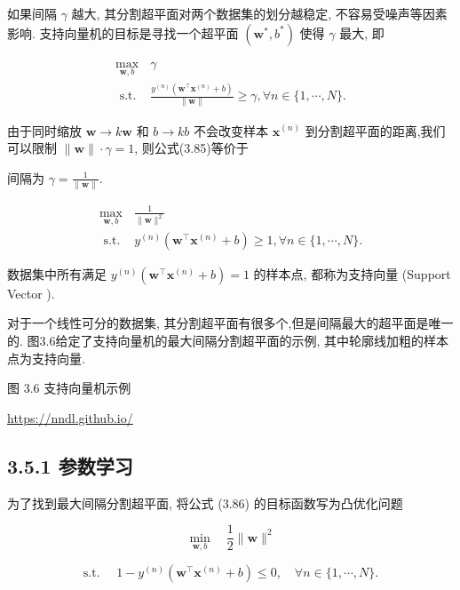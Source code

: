 \documentclass[10pt]{article}
\begin{document}
如果间隔 $\gamma$ 越大, 其分割超平面对两个数据集的划分越稳定, 不容易受噪声等因素影响. 支持向量机的目标是寻找一个超平面 $\left(\boldsymbol{w}^{*}, b^{*}\right)$ 使得 $\gamma$ 最大, 即


\begin{align*}
\max _{\boldsymbol{w}, b} & \gamma  \tag{3.85}\\
\text { s.t. } & \frac{y^{(n)}\left(\boldsymbol{w}^{\top} \boldsymbol{x}^{(n)}+b\right)}{\|\boldsymbol{w}\|} \geq \gamma, \forall n \in\{1, \cdots, N\} .
\end{align*}


由于同时缩放 $\boldsymbol{w} \rightarrow k \boldsymbol{w}$ 和 $b \rightarrow k b$ 不会改变样本 $\boldsymbol{x}^{(n)}$ 到分割超平面的距离,我们可以限制 $\|\boldsymbol{w}\| \cdot \gamma=1$, 则公式(3.85)等价于

间隔为 $\gamma=\frac{1}{\|\boldsymbol{w}\|}$.


\begin{align*}
\max _{\boldsymbol{w}, b} & \frac{1}{\|\boldsymbol{w}\|^{2}}  \tag{3.86}\\
\text { s.t. } & y^{(n)}\left(\boldsymbol{w}^{\top} \boldsymbol{x}^{(n)}+b\right) \geq 1, \forall n \in\{1, \cdots, N\} .
\end{align*}


数据集中所有满足 $y^{(n)}\left(\boldsymbol{w}^{\top} \boldsymbol{x}^{(n)}+b\right)=1$ 的样本点, 都称为支持向量 (Support Vector ).

对于一个线性可分的数据集, 其分割超平面有很多个,但是间隔最大的超平面是唯一的. 图3.6给定了支持向量机的最大间隔分割超平面的示例, 其中轮廓线加粗的样本点为支持向量.



图 3.6 支持向量机示例

\href{https://nndl.github.io/}{https://nndl.github.io/}

\subsection*{3.5.1 参数学习}
为了找到最大间隔分割超平面, 将公式 (3.86) 的目标函数写为凸优化问题


\begin{equation*}
\min _{\boldsymbol{w}, b} \quad \frac{1}{2}\|\boldsymbol{w}\|^{2} \tag{3.87}
\end{equation*}


$$
\text { s.t. } \quad 1-y^{(n)}\left(\boldsymbol{w}^{\top} \boldsymbol{x}^{(n)}+b\right) \leq 0, \quad \forall n \in\{1, \cdots, N\} \text {. }
$$
\end{document}
